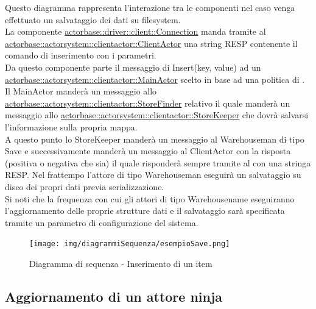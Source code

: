 \documentclass{scalatekids-article}
\begin{document}
Questo diagramma rappresenta l'interazione tra le componenti nel caso venga
effettuato un salvataggio dei dati su filesystem.\\
La componente \hyperref[sec:actorbase::driver::client::Connection]{actorbase::driver::client::Connection}
manda tramite  al \hyperref[sec:actorbase::actorsystem::clientactor::ClientActor]{actorbase::actorsystem::clientactor::ClientActor}
una string RESP contenente il comando di inserimento  con
i parametri.\\ %
Da questo componente parte il messaggio di Insert(key, value) ad un \hyperref[sec:actorbase::actorsystem::clientactor::MainActor]{actorbase::actorsystem::clientactor::MainActor} scelto in base ad una
politica di . Il MainActor manderà un messaggio allo \hyperref[sec:actorbase::actorsystem::clientactor::StoreFinder]{actorbase::actorsystem::clientactor::StoreFinder} relativo il quale manderà un messaggio allo \hyperref[sec:actorbase::actorsystem::clientactor::StoreKeeper]{actorbase::actorsystem::clientactor::StoreKeeper} che dovrà salvarsi l'informazione
sulla propria mappa.\\
A questo punto lo StoreKeeper manderà un messaggio al Warehouseman di tipo Save e
successivamente manderà un messaggio al ClientActor con la risposta
(positiva o negativa che sia) il quale risponderà sempre tramite  al  con una stringa RESP.
Nel frattempo l'attore di tipo Warehouseman eseguirà un salvataggio su disco dei propri dati previa serializzazione.\\
Si noti che la frequenza con cui gli attori di tipo Warehousename eseguiranno
l'aggiornamento delle proprie strutture dati e il salvataggio sarà specificata
tramite un parametro di configurazione del sistema.\\
\begin{figure}[H]
  \begin{center}
    \texttt{[image: img/diagrammiSequenza/esempioSave.png]}
    \caption{Diagramma di sequenza - Inserimento di un item}
  \end{center}
\end{figure}

\subsection{Aggiornamento di un attore ninja}
\end{document}
